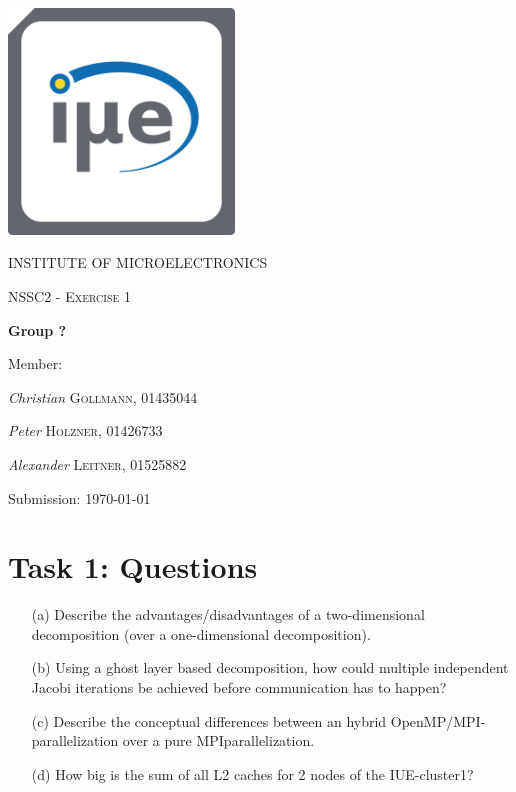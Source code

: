 \documentclass[11pt,a4paper]{article}
\begin{document}
\begin{titlepage}
	\centering
	\begin{center}
	\includegraphics[width=6cm]{IuE-Logo.png}
	\end{center}
	{\scshape\LARGE INSTITUTE OF MICROELECTRONICS\par}
	\vspace{1cm}
	{\scshape\Large NSSC2 - Exercise 1\par}
	\vspace{1.5cm}
	{\huge\bfseries Group ?\par}
	\vspace{2cm}
	Member:\par
	{\Large\textit{Christian} \textsc{Gollmann, 01435044}\par}
	{\Large\textit{Peter} \textsc{Holzner, 01426733}\par}
	{\Large\textit{Alexander} \textsc{Leitner, 01525882}\par}
	\vspace{1.5cm}
	Submission: \today\par
	\vfill
\end{titlepage}
\tableofcontents 
\thispagestyle{empty}
\newpage

\setcounter{page}{1}
\section{Task 1: Questions}
\begin{itemize}	
\item[(a)] Describe the advantages/disadvantages of a two-dimensional decomposition (over a one-dimensional decomposition).
\item[(b)] Using a ghost layer based decomposition, how could multiple independent Jacobi iterations be achieved
before communication has to happen?
\item[(c)] Describe the conceptual differences between an hybrid OpenMP/MPI-parallelization over a pure MPIparallelization.
\item[(d)] How big is the sum of all L2 caches for 2 nodes of the IUE-cluster1?
\end{itemize}
\newpage
\end{document}
